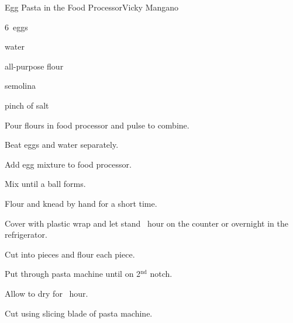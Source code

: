 \begin{recipe}{Egg Pasta in the Food Processor}{Vicky Mangano}{}

\begin{ingredients}
\item 6~eggs
\item \C{\quarter} water
\item {} all-purpose flour
\item {} semolina
\item pinch of salt
\end{ingredients}

\begin{directions}
\item Pour flours in food processor and pulse to combine.
\item Beat eggs and water separately.
\item Add egg mixture to food processor.
\item Mix until a ball forms.
\item Flour and knead by hand for a short time.
\item Cover with plastic wrap and let stand \half~hour on the counter or overnight in the refrigerator.
\item Cut into pieces and flour each piece.
\item Put through pasta machine until on 2$^{\mathrm{nd}}$ notch.
\item Allow to dry for \half~hour.
\item Cut using slicing blade of pasta machine.
\end{directions}

\end{recipe}
